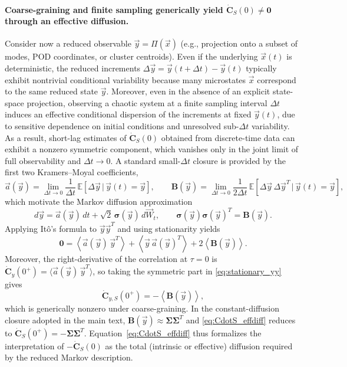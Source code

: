 \documentclass[%
  prl,
  reprint,
  amsmath,
  amssymb,
  aps
]{revtex4-2}
\newcommand{\vvec}[1]{\vec{#1}}
\begin{document}
\paragraph{Coarse-graining and finite sampling generically yield $\dot{\bm{C}}_S(0)\neq \bm{0}$ through an effective diffusion.}
Consider now a reduced observable $\vvec{y}=\Pi(\vvec{x})$ (e.g., projection onto a subset of modes, POD coordinates, or cluster centroids). Even if the underlying $\vvec{x}(t)$ is deterministic, the reduced increments $\Delta \vvec{y}=\vvec{y}(t+\Delta t)-\vvec{y}(t)$ typically exhibit nontrivial conditional variability because many microstates $\vvec{x}$ correspond to the same reduced state $\vvec{y}$. Moreover, even in the absence of an explicit state-space projection, observing a chaotic system at a finite sampling interval $\Delta t$ induces an effective conditional dispersion of the increments at fixed $\vvec{y}(t)$, due to sensitive dependence on initial conditions and unresolved sub-$\Delta t$ variability. As a result, short-lag estimates of $\dot{\bm{C}}_S(0)$ obtained from discrete-time data can exhibit a nonzero symmetric component, which vanishes only in the joint limit of full observability and $\Delta t\to 0$. A standard small-$\Delta t$ closure is provided by the first two Kramers--Moyal coefficients,
\begin{equation}
\vvec{a}(\vvec{y}) = \lim_{\Delta t\to 0}\frac{1}{\Delta t}\,\mathbb{E}\!\left[\Delta \vvec{y}\,|\,\vvec{y}(t)=\vvec{y}\right],
\qquad
\bm{B}(\vvec{y}) = \lim_{\Delta t\to 0}\frac{1}{2\Delta t}\,\mathbb{E}\!\left[\Delta \vvec{y}\,\Delta \vvec{y}^T\,|\,\vvec{y}(t)=\vvec{y}\right],
\label{eq:KM}
\end{equation}
which motivate the Markov diffusion approximation
\begin{equation}
d\vvec{y} = \vvec{a}(\vvec{y})\,dt + \sqrt{2}\,\bm{\sigma}(\vvec{y})\,d\vvec{W}_t,
\qquad
\bm{\sigma}(\vvec{y})\bm{\sigma}(\vvec{y})^T=\bm{B}(\vvec{y}).
\label{eq:effSDE}
\end{equation}
Applying It\^o's formula to $\vvec{y}\vvec{y}^T$ and using stationarity yields
\begin{equation}
\bm{0}
=
\left\langle \vvec{a}(\vvec{y})\,\vvec{y}^T\right\rangle
+
\left\langle \vvec{y}\,\vvec{a}(\vvec{y})^T\right\rangle
+
2\left\langle \bm{B}(\vvec{y})\right\rangle.
\label{eq:stationary_yy}
\end{equation}
Moreover, the right-derivative of the correlation at $\tau=0$ is $\dot{\bm{C}}_{\!y}(0^+)=\langle \vvec{a}(\vvec{y})\,\vvec{y}^T\rangle$, so taking the symmetric part in \eqref{eq:stationary_yy} gives
\begin{equation}
\dot{\bm{C}}_{\!y,S}(0^+) = -\left\langle \bm{B}(\vvec{y})\right\rangle,
\label{eq:CdotS_effdiff}
\end{equation}
which is generically nonzero under coarse-graining. In the constant-diffusion closure adopted in the main text, $\bm{B}(\vvec{y})\approx \bm{\Sigma}\bm{\Sigma}^T$ and \eqref{eq:CdotS_effdiff} reduces to $\dot{\bm{C}}_S(0^+)=-\bm{\Sigma}\bm{\Sigma}^T$. Equation~\eqref{eq:CdotS_effdiff} thus formalizes the interpretation of $-\dot{\bm{C}}_S(0)$ as the total (intrinsic or effective) diffusion required by the reduced Markov description.
\end{document}
